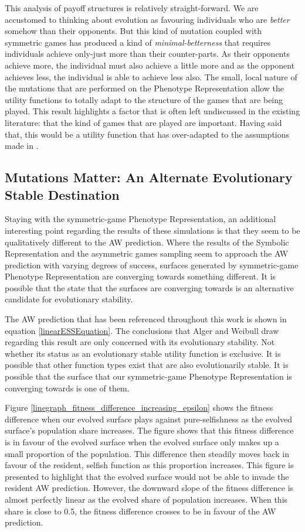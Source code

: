 \documentclass[11pt]{book}
\newcommand*{\np}{\par\noindent\newline}
\begin{document}
\np This analysis of payoff structures is relatively straight-forward.
We are accustomed to thinking about evolution as favouring individuals who are \textit{better} somehow than their opponents. 
But this kind of mutation coupled with symmetric games has produced a kind of \textit{minimal-betterness} that requires individuals achieve only-just more than their counter-parts.
As their opponents achieve more, the individual must also achieve a little more and as the opponent achieves less, the individual is able to achieve less also.
The small, local nature of the mutations that are performed on the Phenotype Representation allow the utility functions to totally adapt to the structure of the games that are being played.
This result highlights a factor that is often left undiscussed in the existing literature: that the kind of games that are played are important. 
Having said that, this would be a utility function that has over-adapted to the assumptions made in \citet{alger_generalization_2012}.

\subsection[Mutations Matter]{Mutations Matter: An Alternate Evolutionary Stable Destination}
Staying with the symmetric-game Phenotype Representation, an additional interesting point regarding the results of these simulations is that they seem to be qualitatively different to the AW prediction.
Where the results of the Symbolic Representation and the asymmetric games sampling seem to approach the AW prediction with varying degrees of success, surfaces generated by symmetric-game Phenotype Representation are converging towards something different.
It is possible that the state that the surfaces are converging towards is an alternative candidate for evolutionary stability.

\np The AW prediction that has been referenced throughout this work is shown in equation \ref{linearESSEquation}.
The conclusions that Alger and Weibull draw regarding this result are only concerned with its evolutionary stability.
Not whether its status as an evolutionary stable utility function is exclusive.
It is possible that other function types exist that are also evolutionarily stable.
It is possible that the surface that our symmetric-game Phenotype Representation is converging towards is one of them.

\np Figure \ref{linegraph_fitness_difference_increasing_epsilon} 
shows the fitness difference when our evolved surface plays against pure-selfishness as the evolved surface's population share increases.
The figure shows that this fitness difference is in favour of the evolved surface when the evolved surface only makes up a small proportion of the population.
This difference then steadily moves back in favour of the resident, selfish function as this proportion increases.
This figure is presented to highlight that the evolved surface would not be able to invade the resident AW prediction.
However, the downward slope of the fitness difference is almost perfectly linear as the evolved share of population increases.
When this share is close to 0.5, the fitness difference crosses to be in favour of the AW prediction.
\end{document}
